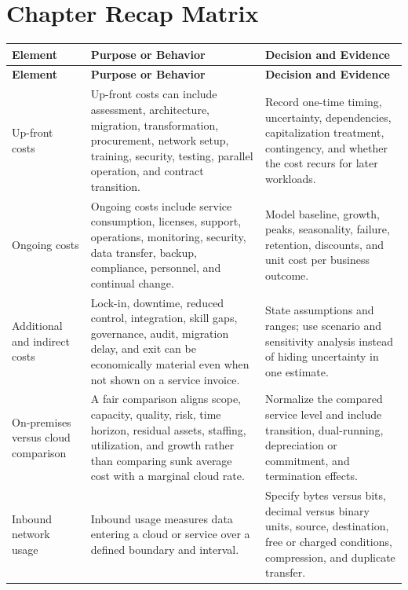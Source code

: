 \documentclass[11pt]{article}
\begin{document}
\section{Chapter Recap Matrix}
\begingroup\small\setlength{\tabcolsep}{4pt}
\begin{longtable}{@{}>{\RaggedRight\arraybackslash}p{}>{\RaggedRight\arraybackslash}p{}>{\RaggedRight\arraybackslash}p{}@{}}
\toprule\rowcolor{Navy}\color{white}\textbf{Element} & \color{white}\textbf{Purpose or Behavior} & \color{white}\textbf{Decision and Evidence}\\\midrule\endfirsthead
\toprule\rowcolor{Navy}\color{white}\textbf{Element} & \color{white}\textbf{Purpose or Behavior} & \color{white}\textbf{Decision and Evidence}\\\midrule\endhead
Up-front costs & Up-front costs can include assessment, architecture, migration, transformation, procurement, network setup, training, security, testing, parallel operation, and contract transition. & Record one-time timing, uncertainty, dependencies, capitalization treatment, contingency, and whether the cost recurs for later workloads. \\\midrule
Ongoing costs & Ongoing costs include service consumption, licenses, support, operations, monitoring, security, data transfer, backup, compliance, personnel, and continual change. & Model baseline, growth, peaks, seasonality, failure, retention, discounts, and unit cost per business outcome. \\\midrule
Additional and indirect costs & Lock-in, downtime, reduced control, integration, skill gaps, governance, audit, migration delay, and exit can be economically material even when not shown on a service invoice. & State assumptions and ranges; use scenario and sensitivity analysis instead of hiding uncertainty in one estimate. \\\midrule
On-premises versus cloud comparison & A fair comparison aligns scope, capacity, quality, risk, time horizon, residual assets, staffing, utilization, and growth rather than comparing sunk average cost with a marginal cloud rate. & Normalize the compared service level and include transition, dual-running, depreciation or commitment, and termination effects. \\\midrule
Inbound network usage & Inbound usage measures data entering a cloud or service over a defined boundary and interval. & Specify bytes versus bits, decimal versus binary units, source, destination, free or charged conditions, compression, and duplicate transfer. \\\midrule

\end{longtable}
\end{document}
